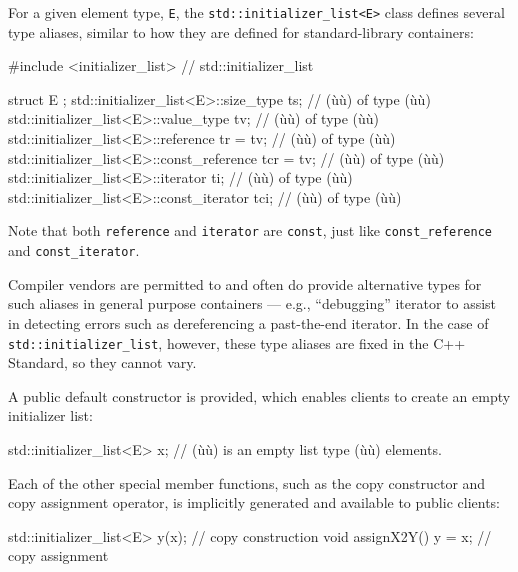 For a given element type, \lstinline!E!, the
\lstinline!std::initializer_list<E>! class defines several type aliases,
similar to how they are defined for standard-library containers:

\begin{emcppslisting}
#include <initializer_list>  // std::initializer_list

struct E { };
std::initializer_list<E>::size_type       ts;        // (ù{}ù)  of type (ù{}ù)
std::initializer_list<E>::value_type      tv;        // (ù{}ù)  of type (ù{}ù)
std::initializer_list<E>::reference       tr  = tv;  // (ù{}ù)  of type (ù{}ù)
std::initializer_list<E>::const_reference tcr = tv;  // (ù{}ù) of type (ù{}ù)
std::initializer_list<E>::iterator        ti;        // (ù{}ù)  of type (ù{}ù)
std::initializer_list<E>::const_iterator  tci;       // (ù{}ù) of type (ù{}ù)
\end{emcppslisting}
    

\noindent Note that both \lstinline!reference! and \lstinline!iterator! are
\lstinline!const!, just like \lstinline!const_reference! and
\lstinline!const_iterator!.

Compiler vendors are permitted to and often do provide alternative types
for such aliases in general purpose containers --- e.g., ``debugging''
iterator to assist in detecting errors such as dereferencing a
past-the-end iterator. In the case of \lstinline!std::initializer_list!,
however, these type aliases are fixed in the C++ Standard, so they
cannot vary.

A public default constructor is provided, which enables clients to
create an empty initializer list:

\begin{emcppslisting}
std::initializer_list<E> x;  // (ù{}ù) is an empty list type (ù{}ù) elements.
\end{emcppslisting}
    

\noindent Each of the other special member functions, such as the copy constructor
and copy assignment operator, is implicitly generated and available to
public clients:

\begin{emcppslisting}
std::initializer_list<E> y(x);  // copy construction
void assignX2Y() { y = x; }     // copy assignment
\end{emcppslisting}
    

